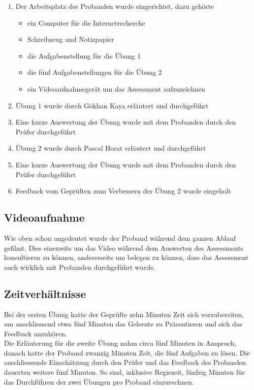 \begin{enumerate}
\item Der Arbeitsplatz des Probanden wurde eingerichtet, dazu gehörte
\begin{itemize}
\item ein Computer für die Internetrecherche
\item Schreibzeug und Notizpapier
\item die Aufgabenstellung für die Übung 1
\item die fünf Aufgabenstellungen für die Übung 2
\item ein Videoaufnahmegerät um das Assessment aufzuzeichnen
\end{itemize}
\item Übung 1 wurde durch Gökhan Kaya erläutert und durchgeführt
\item Eine kurze Auswertung der Übung wurde mit dem Probanden durch den Prüfer durchgeführt
\item Übung 2 wurde durch Pascal Horat erläutert und durchgeführt
\item Eine kurze Auswertung der Übung wurde mit dem Probanden durch den Prüfer durchgeführt
\item Feedback vom Geprüften zum Verbessern der Übung 2 wurde eingeholt
\end{enumerate}

\subsection{Videoaufnahme}

Wie oben schon angedeutet wurde der Proband während dem ganzen Ablauf gefilmt. Dies einerseits um das Video während dem Auswerten des Assessments konsultieren zu können, andererseits um belegen zu können, dass das Assessment auch wirklich mit Probanden durchgeführt wurde.
\subsection{Zeitverhältnisse} \label{ssec:Zeitverhaeltnisse}
Bei der ersten Übung hatte der Geprüfte zehn Minuten Zeit sich vorzubereiten, um anschliessend etwa fünf Minuten das Gelernte zu Präsentieren und sich das Feedback anzuhören.\\ Die Erläuterung für die zweite Übung nahm circa fünf Minuten in Anspruch, danach hatte der Proband zwanzig Minuten Zeit, die fünf Aufgaben zu lösen. Die anschliessende Einschätzung durch den Prüfer und das Feedback des Probanden dauerten weitere fünf Minuten. So sind, inklusive Regiezeit, fünfzig Minuten für das Durchführen der zwei Übungen pro Proband einzurechnen.
